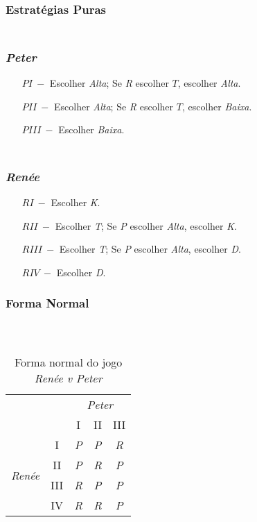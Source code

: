 \subsubsection{Estratégias Puras}
\begin{frame}
\frametitle{\subsubsecname\\\emph{Peter}}
\begin{enumerate}
	\item[$ PI\ -$] Escolher \emph{Alta}; Se \emph{R} escolher $T$, escolher \emph{Alta}.
	\item[$ PII\ -$] Escolher \emph{Alta}; Se \emph{R} escolher $T$, escolher \emph{Baixa}.
	\item[$ PIII\ -$] Escolher \emph{Baixa}.
\end{enumerate}
\end{frame}

\begin{frame}
\frametitle{\subsubsecname\\\emph{Renée}}
\begin{enumerate}
	\item[$ RI\ -$] Escolher \emph{K}.
	\item[$ RII\ -$] Escolher \emph{T}; Se \emph{P} escolher \emph{Alta}, escolher \emph{K}.
	\item[$ RIII\ -$] Escolher \emph{T}; Se \emph{P} escolher \emph{Alta}, escolher \emph{D}.
	\item[$ RIV\ -$] Escolher \emph{D}.
\end{enumerate}
\end{frame}

\subsubsection{Forma Normal}
\begin{frame}
\frametitle{\subsecname\\}
\begin{table}[ht]
\centering
\begin{tabular}{cc|ccc}
\hline
 &  & \multicolumn{3}{c}{\emph{Peter}}\tabularnewline
 &  & I & II & III\tabularnewline
\hline
\multirow{4}{*}{\begin{turn}{90}
\emph{Renée}
\end{turn}} & I & \emph{P} & \emph{P} & \emph{R}\tabularnewline
 & II & \emph{P} & \emph{R} & \emph{P}\tabularnewline
 & III & \emph{R} & \emph{P} & \emph{P}\tabularnewline
 & IV & \emph{R} & \emph{R} & \emph{P}\tabularnewline
\hline
\end{tabular}
\caption{Forma normal do jogo \emph{Renée v Peter}}
\label{tab:forma-normal-do-jogo-renee-v-peter}
\end{table}
\end{frame}

